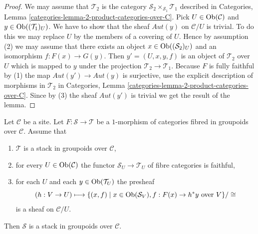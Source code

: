 \begin{proof}
We may assume that $\mathcal{T}_2$ is the category
$\mathcal{S}_2 \times_{\mathcal{S}_1} \mathcal{T}_1$
described in
Categories, Lemma \ref{categories-lemma-2-product-categories-over-C}.
Pick $U \in \mathop{\mathrm{Ob}}\nolimits(\mathcal{C})$ and
$y \in \mathop{\mathrm{Ob}}\nolimits((\mathcal{T}_1)_U)$.
We have to show that the sheaf $\mathit{Aut}(y)$ on $\mathcal{C}/U$
is trivial. To do this we may replace $U$ by the members of
a covering of $U$. Hence by assumption (2) we may assume that
there exists an object $x \in \mathop{\mathrm{Ob}}\nolimits((\mathcal{S}_2)_U)$
and an isomorphism $f : F(x) \to G(y)$.
Then $y' = (U, x, y, f)$ is an object of $\mathcal{T}_2$ over $U$
which is mapped to $y$ under the projection $\mathcal{T}_2 \to \mathcal{T}_1$.
Because $F$ is fully faithful by (1) the map
$\mathit{Aut}(y') \to \mathit{Aut}(y)$ is surjective, use the explicit
description of morphisms in $\mathcal{T}_2$ in
Categories, Lemma \ref{categories-lemma-2-product-categories-over-C}.
Since by (3) the sheaf $\mathit{Aut}(y')$ is trivial
we get the result of the lemma.
\end{proof}

\begin{lemma}
\label{lemma-relative-sheaf-over-stack-is-stack}
Let $\mathcal{C}$ be a site. Let $F : \mathcal{S} \to \mathcal{T}$
be a $1$-morphism of categories fibred in groupoids over $\mathcal{C}$.
Assume that
\begin{enumerate}
\item $\mathcal{T}$ is a stack in groupoids over $\mathcal{C}$,
\item for every $U \in \mathop{\mathrm{Ob}}\nolimits(\mathcal{C})$ the functor
$\mathcal{S}_U \to \mathcal{T}_U$ of fibre categories is faithful,
\item for each $U$ and each $y \in \mathop{\mathrm{Ob}}\nolimits(\mathcal{T}_U)$ the presheaf
$$
(h : V \to U)
\longmapsto
\{(x, f) \mid x \in \mathop{\mathrm{Ob}}\nolimits(\mathcal{S}_V), f : F(x) \to h^*y\text{ over }V\}/\cong
$$
is a sheaf on $\mathcal{C}/U$.
\end{enumerate}
Then $\mathcal{S}$ is a stack in groupoids over $\mathcal{C}$.
\end{lemma}


